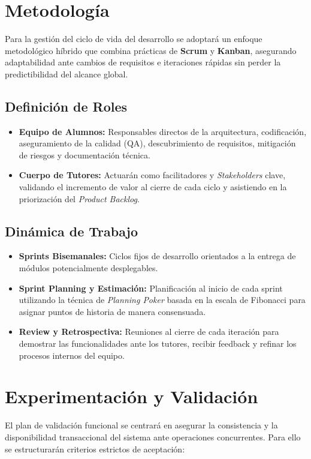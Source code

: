 \documentclass[11pt, a4paper]{article}
\begin{document}
\section{Metodología}
Para la gestión del ciclo de vida del desarrollo se adoptará un enfoque metodológico híbrido que combina prácticas de \textbf{Scrum} y \textbf{Kanban}, asegurando adaptabilidad ante cambios de requisitos e iteraciones rápidas sin perder la predictibilidad del alcance global.

\subsection{Definición de Roles}
\begin{itemize}
    \item \textbf{Equipo de Alumnos:} Responsables directos de la arquitectura, codificación, aseguramiento de la calidad (QA), descubrimiento de requisitos, mitigación de riesgos y documentación técnica.
    \item \textbf{Cuerpo de Tutores:} Actuarán como facilitadores y \textit{Stakeholders} clave, validando el incremento de valor al cierre de cada ciclo y asistiendo en la priorización del \textit{Product Backlog}.
\end{itemize}

\subsection{Dinámica de Trabajo}
\begin{itemize}
    \item \textbf{Sprints Bisemanales:} Ciclos fijos de desarrollo orientados a la entrega de módulos potencialmente desplegables.
    \item \textbf{Sprint Planning y Estimación:} Planificación al inicio de cada sprint utilizando la técnica de \textit{Planning Poker} basada en la escala de Fibonacci para asignar puntos de historia de manera consensuada.
    \item \textbf{Review y Retrospectiva:} Reuniones al cierre de cada iteración para demostrar las funcionalidades ante los tutores, recibir feedback y refinar los procesos internos del equipo.
\end{itemize}


\section{Experimentación y Validación}
El plan de validación funcional se centrará en asegurar la consistencia y la disponibilidad transaccional del sistema ante operaciones concurrentes. Para ello se estructurarán criterios estrictos de aceptación:
\end{document}
